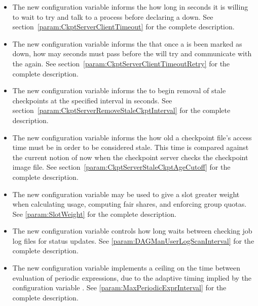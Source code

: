 \begin{itemize}

\item The new configuration variable 
informs the  how long in seconds it is willing to wait
to try and talk to a  process before declaring a
 down.
See section~\ref{param:CkptServerClientTimeout} for the complete description.

\item The new configuration variable
 informs the 
that once a  is been marked as down, how may seconds
must pass before the  will try and communicate with the
 again.
See section~\ref{param:CkptServerClientTimeoutRetry} 
for the complete description.

\item The new configuration variable
 informs the
 to begin removal of stale checkpoints at the specified
interval in seconds.
See section~\ref{param:CkptServerRemoveStaleCkptInterval} 
for the complete description.

\item The new configuration variable
 informs the
 how old a checkpoint file's access time must be
in order to be considered stale. This time is compared against the
current notion of now
when the checkpoint server checks the checkpoint image file.
See section~\ref{param:CkptServerStaleCkptAgeCutoff} 
for the complete description.

\item The new configuration variable  may be used to
give a slot greater weight when calculating usage, computing fair
shares, and enforcing group quotas.  
See \ref{param:SlotWeight} for the complete description.


\item The new configuration variable 
controls how long  waits between checking job log files
for status updates.
See \ref{param:DAGManUserLogScanInterval} for the complete description.

\item The new configuration variable 
  implements a ceiling on the time between evaluation of periodic expressions,
  due to the adaptive timing implied by the configuration variable
  .
  See \ref{param:MaxPeriodicExprInterval} for the complete description.


\end{itemize}
